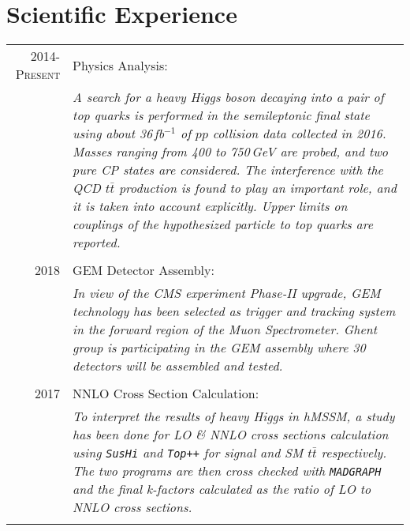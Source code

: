 \documentclass[a4paper,10pt]{article}
\begin{document}
\section{Scientific Experience}
\begin{tabular}{r|p{11.60cm}}
\textsc{2014-Present} & Physics Analysis: \\&\emph{A search for a heavy Higgs boson decaying into a pair of top quarks is performed in the semileptonic final state using about 36\,fb$^{-1}$ of $pp$ collision data collected in 2016. Masses ranging from 400 to 750\,GeV are probed, and two pure CP states are considered. The interference with the QCD $t\bar t$ production is found to play an important role, and it is taken into account explicitly. Upper limits on couplings of the hypothesized particle to top quarks are reported. }\\\multicolumn{2}{c}{} \\
\textsc{2018} & GEM Detector Assembly:\\&\emph{In view of the CMS experiment Phase-II upgrade, GEM technology has been selected as trigger and tracking system in the forward region of the Muon Spectrometer. Ghent group is participating in the GEM assembly where 30 detectors will be assembled and tested.}\\\multicolumn{2}{c}{} \\
\textsc{2017} & NNLO Cross Section Calculation:\\&\emph{To interpret the results of heavy Higgs in hMSSM, a study has been done for LO \& NNLO cross sections calculation using \texttt{SusHi} and \texttt{Top++} for signal and SM $t\bar t$ respectively. The two programs are then cross checked with \texttt{MADGRAPH} and the final k-factors calculated as the ratio of LO to NNLO cross sections.}\\\multicolumn{2}{c}{} 
\end{tabular}\newline
\end{document}
